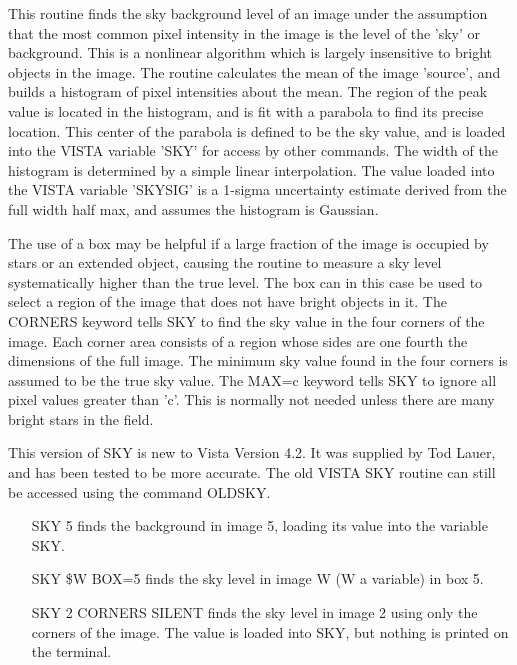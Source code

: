 This routine finds the sky background level of an image under the
assumption that the most common pixel intensity in the image is the level
of the 'sky' or background.  This is a nonlinear algorithm which is largely
insensitive to bright objects in the image. The routine calculates the mean
of the image 'source', and builds a histogram of pixel intensities about
the mean. The region of the peak value is located in the histogram, and is
fit with a parabola to find its precise location. This center of the
parabola is defined to be the sky value, and is loaded into the VISTA
variable 'SKY' for access by other commands.  The width of the histogram is
determined by a simple linear interpolation.  The value loaded into the
VISTA variable 'SKYSIG' is a 1-sigma uncertainty estimate derived from the
full width half max, and assumes the histogram is Gaussian.

The use of a box may be helpful if a large fraction of the image is
occupied by stars or an extended object, causing the routine to measure a
sky level systematically higher than the true level.  The box can in this
case be used to select a region of the image that does not have bright
objects in it.  The CORNERS keyword tells SKY to find the sky value in the
four corners of the image.  Each corner area consists of a region whose
sides are one fourth the dimensions of the full image.  The minimum sky
value found in the four corners is assumed to be the true sky value.  The
MAX=c keyword tells SKY to ignore all pixel values greater than 'c'.  This
is normally not needed unless there are many bright stars in the field.

This version of SKY is new to Vista Version 4.2. It was supplied by Tod
Lauer, and has been tested to be more accurate. The old VISTA SKY routine
can still be accessed using the command OLDSKY.

\begin{itemize}
  \item[SKY 5\hfill]{ finds the background in image 5, loading 
  its value into the variable SKY.}
  \item[SKY \$W BOX=5\hfill]{finds the sky level in image W
  (W a variable) in box 5.}
  \item[SKY 2 CORNERS SILENT\hfill]{finds the sky level in image 2 using
  only the corners of the image.  The value is loaded into SKY, but nothing
  is printed on the terminal.}
\end{itemize}

